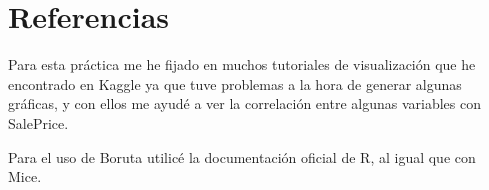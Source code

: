 \documentclass[14pt]{extarticle}
\begin{document}
\section{Referencias}

Para esta práctica me he fijado en muchos tutoriales de visualización que he encontrado en Kaggle ya que tuve problemas a la hora de generar algunas gráficas, y con ellos me ayudé a ver la correlación entre algunas variables con SalePrice.

Para el uso de Boruta utilicé la documentación oficial de R, al igual que con Mice.
\end{document}
